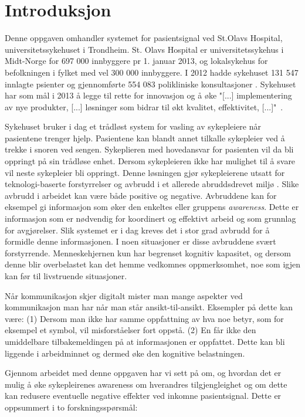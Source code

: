 \chapter{Introduksjon}
\label{chp: introduksjon}

Denne oppgaven omhandler systemet for pasientsignal ved St.Olavs Hospital, universitetssykehuset i Trondheim. St. Olavs Hospital er universitetssykehus i Midt-Norge for 697 000 innbyggere pr 1. januar 2013, og lokalsykehus for befolkningen i fylket med vel 300 000 innbyggere. I 2012 hadde sykehuset 131 547 innlagte psienter og gjennomførte 554 083 polikliniske konsultasjoner \cite{stolavs}. Sykehuset har som mål i 2013 å legge til rette for innovasjon og å øke "[...] implementering av nye produkter, [...] løsninger som bidrar til økt kvalitet, effektivitet, [...]"\ \cite{styring13}.

\noindent
Sykehuset bruker i dag et trådløst system for vasling av sykepleiere når pasientene trenger hjelp. Pasientene kan blandt annet tilkalle sykepleier ved å trekke i snoren ved sengen. Sykeplieren med hovedansvar for pasienten vil da bli oppringt på sin trådløse enhet. Dersom sykepleieren ikke har mulighet til å svare vil neste sykepleier bli oppringt. Denne løsningen gjør sykepleierene utsatt for teknologi-baserte forstyrrelser og avbrudd i et allerede abruddsdrevet miljø \cite{Klemets12}. Slike avbrudd i arbeidet kan være både positive og negative. Avbruddene kan for eksempel gi informasjon som øker den enkeltes eller gruppens \emph{awareness}. Dette er informasjon som er nødvendig for koordinert og effektivt arbeid og som grunnlag for avgjørelser. Slik systemet er i dag kreves det i stor grad avbrudd for å formidle denne informasjonen. I noen situasjoner er disse avbruddene svært forstyrrende. Menneskehjernen kun har begrenset kognitiv kapasitet, og dersom denne blir overbelastet kan det hemme vedkomnes oppmerksomhet, noe som igjen kan før til livstruende situasjoner. 

\noindent
Når kommunikasjon skjer digitalt mister man mange aspekter ved kommunikasjon man har når man står ansikt-til-ansikt. Eksempler på dette kan være: (1) Dersom man ikke har samme oppfattning av hva noe betyr, som for eksempel et symbol, vil misforståelser fort oppstå. (2) En får ikke den umiddelbare tilbakemeldingen på at informasjonen er oppfattet. Dette kan bli liggende i arbeidminnet og dermed øke den kognitive belastningen. 

\noindent
Gjennom arbeidet med denne oppgaven har vi sett på om, og hvordan det er mulig å øke sykepleirenes awareness om hverandres tilgjengleighet og om dette kan redusere eventuelle negative effekter ved inkomne pasientsignal. Dette er oppsummert i to forskningsspørsmål:

